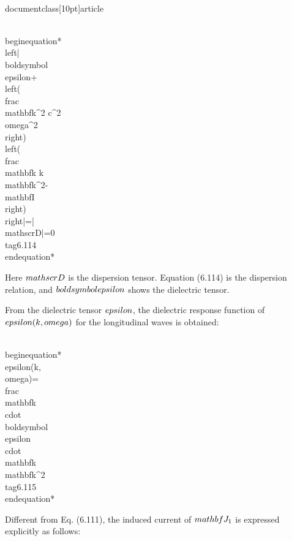 \\documentclass[10pt]{article}
\begin{document}
{{{{\\begin{equation*}
\\left|\\boldsymbol{\\epsilon}+\\left(\\frac{\\mathbf{k}^{2} c^{2}}{\\omega^{2}}\\right)\\left(\\frac{\\mathbf{k k}}{\\mathbf{k}^{2}}-\\mathbf{I}\\right)\\right|=|\\mathscr{D}|=0 \\tag{6.114}
\\end{equation*}


Here $\\mathscr{D}$ is the dispersion tensor. Equation (6.114) is the dispersion relation, and $\\boldsymbol{\\epsilon}$ shows the dielectric tensor.

From the dielectric tensor $\\epsilon$, the dielectric response function of $\\epsilon(k, \\omega)$ for the longitudinal waves is obtained:


\\begin{equation*}
\\epsilon(k, \\omega)=\\frac{\\mathbf{k} \\cdot \\boldsymbol{\\epsilon} \\cdot \\mathbf{k}}{\\mathbf{k}^{2}} \\tag{6.115}
\\end{equation*}


Different from Eq. (6.111), the induced current of $\\mathbf{J}_{1}$ is expressed explicitly as follows:


}}}}
\end{document}
